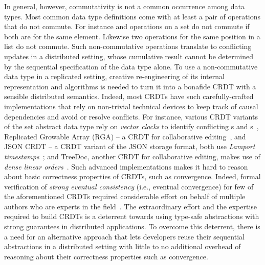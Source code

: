 In general, however, commutativity is not a common occurrence among
data types. Most common data type definitions come with at least a
pair of operations that do not commute. For instance  and
 operations on a set do not commute if both are for the same
element.  Likewise two  operations for the same position in
a list do not commute. Such non-commutative operations translate to
conflicting updates in a distributed setting, whose cumulative result
cannot be determined by the sequential specification of the data type
alone. To use a non-commutative data type in a replicated setting,
creative re-engineering of its internal representation and algorithms
is needed to turn it into a bonafide CRDT with a sensible distributed
semantics.
Indeed, most CRDTs have such carefully-crafted implementations that
rely on non-trivial technical devices to keep track of causal
dependencies and avoid or resolve conflicts. For instance, various
CRDT variants of the set abstract data type rely on \emph{vector
clocks} to identify conflicting s and
s~\cite{zawirski-thesis, zhang}, Replicated Growable Array
(RGA) -- a CRDT for collaborative editing~\cite{rga}, and JSON CRDT --
a CRDT variant of the JSON storage format, both use \emph{Lamport
timestamps}~\cite{rga, json-crdt}; and TreeDoc, another CRDT for
collaborative editing, makes use of \emph{dense linear
orders}~\cite{treedoc}. Such advanced implementations makes it hard to
reason about basic correctness properties of CRDTs, such as
convergence. Indeed, formal verification of \emph{strong eventual
consistency} (i.e., eventual convergence) for few of the
aforementioned CRDTs required considerable effort on behalf of
multiple authors who are experts in the field~\cite{kleppmann2017}.
The extraordinary effort and the expertise required to build CRDTs is
a deterrent towards using type-safe abstractions with strong
guarantees in distributed applications. To overcome this deterrent,
there is a need for an alternative approach that lets developers reuse
their sequential abstractions in a distributed setting with little to
no additional overhead of reasoning about their correctness properties
such as convergence.

